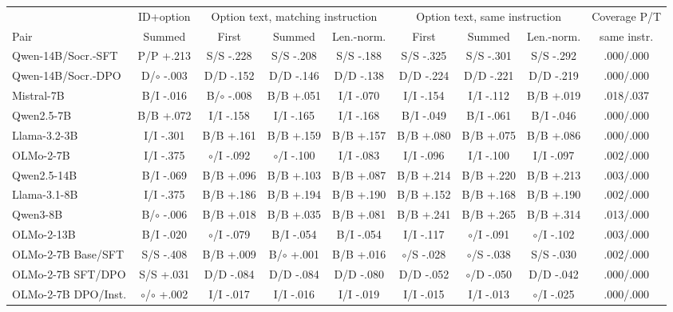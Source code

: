 \begin{table}[t]
\centering\scriptsize
\setlength{\tabcolsep}{3pt}
\begin{tabular}{@{}lcccccccc@{}}
\toprule
& ID+option & \multicolumn{3}{c}{Option text, matching instruction} & \multicolumn{3}{c}{Option text, same instruction} & Coverage P/T \\
\cmidrule(lr){2-2}\cmidrule(lr){3-5}\cmidrule(lr){6-8}\cmidrule(l){9-9}
Pair & Summed & First & Summed & Len.-norm. & First & Summed & Len.-norm. & same instr. \\
\midrule
Qwen-14B/Socr.-SFT & P/P +.213 & S/S -.228 & S/S -.208 & S/S -.188 & S/S -.325 & S/S -.301 & S/S -.292 & .000/.000 \\
Qwen-14B/Socr.-DPO & D/$\circ$ -.003 & D/D -.152 & D/D -.146 & D/D -.138 & D/D -.224 & D/D -.221 & D/D -.219 & .000/.000 \\
\addlinespace[2pt]
Mistral-7B & B/I -.016 & B/$\circ$ -.008 & B/B +.051 & I/I -.070 & I/I -.154 & I/I -.112 & B/B +.019 & .018/.037 \\
Qwen2.5-7B & B/B +.072 & I/I -.158 & I/I -.165 & I/I -.168 & B/I -.049 & B/I -.061 & B/I -.046 & .000/.000 \\
Llama-3.2-3B & I/I -.301 & B/B +.161 & B/B +.159 & B/B +.157 & B/B +.080 & B/B +.075 & B/B +.086 & .000/.000 \\
OLMo-2-7B & I/I -.375 & $\circ$/I -.092 & $\circ$/I -.100 & I/I -.083 & I/I -.096 & I/I -.100 & I/I -.097 & .002/.000 \\
\addlinespace[2pt]
Qwen2.5-14B & B/I -.069 & B/B +.096 & B/B +.103 & B/B +.087 & B/B +.214 & B/B +.220 & B/B +.213 & .003/.000 \\
Llama-3.1-8B & I/I -.375 & B/B +.186 & B/B +.194 & B/B +.190 & B/B +.152 & B/B +.168 & B/B +.190 & .002/.000 \\
Qwen3-8B & B/$\circ$ -.006 & B/B +.018 & B/B +.035 & B/B +.081 & B/B +.241 & B/B +.265 & B/B +.314 & .013/.000 \\
OLMo-2-13B & B/I -.020 & $\circ$/I -.079 & B/I -.054 & B/I -.054 & I/I -.117 & $\circ$/I -.091 & $\circ$/I -.102 & .003/.000 \\
\addlinespace[2pt]
OLMo-2-7B Base/SFT & S/S -.408 & B/B +.009 & B/$\circ$ +.001 & B/B +.016 & $\circ$/S -.028 & $\circ$/S -.038 & S/S -.030 & .002/.000 \\
OLMo-2-7B SFT/DPO & S/S +.031 & D/D -.084 & D/D -.084 & D/D -.080 & D/D -.052 & $\circ$/D -.050 & D/D -.042 & .000/.000 \\
OLMo-2-7B DPO/Inst. & $\circ$/$\circ$ +.002 & I/I -.017 & I/I -.016 & I/I -.019 & I/I -.015 & I/I -.013 & $\circ$/I -.025 & .000/.000 \\

\end{tabular}
\end{table}
